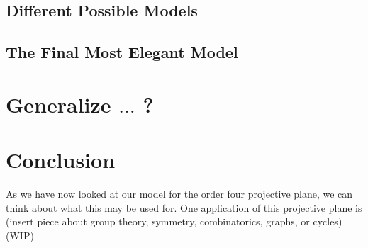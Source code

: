 \documentclass{article}
\begin{document}
\subsection{Different Possible Models}
\subsection{The Final Most Elegant Model}

\section{Generalize $\dots$ ?}

\section{Conclusion}
As we have now looked at our model for the order four projective plane, we can think about what this may be used for. One application of this projective plane is (insert piece about group theory, symmetry, combinatorics, graphs, or cycles) (WIP)
\end{document}
